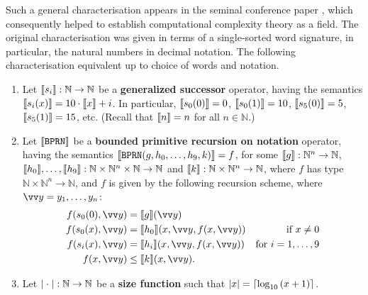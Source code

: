 Such a general characterisation appears in the seminal conference paper
\cite{cobham-1965}, which consequently helped to establish computational
complexity theory as a field\cite{clote-1999}. The original characterisation
was given in terms of a single-sorted word signature, in particular, the
natural numbers in decimal notation. The following characterisation equivalent
up to choice of words and notation. 

\def\smashf{\ensuremath{\mathtt{\#}}}
\def\cdotnot{\ensuremath{\cdot}}

\begin{definition} \cite{cobham-1965}

\begin{enumerate}[label=(\arabic*)]

\item Let $\sem{s_i} : \mathbb{N} \rightarrow \mathbb{N}$ be a
\textbf{generalized successor} operator, having the semantics $\sem{s_i\p{x}} =
10 \cdot \sem{x} + i$. In particular, $\sem{s_0\p{0}} = 0$, $\sem{s_0\p{1}} =
10$, $\sem{s_5\p{0}} = 5$, $\sem{s_5\p{1}} = 15$, etc. (Recall that $\sem{n} =
n$ for all $n \in \mathbb{N}$.)

\item Let $\sem{\mathtt{BPRN}}$ be a \textbf{bounded primitive recursion on
notation} operator, having the semantics
$\sem{\mathtt{BPRN}\p{g,h_0,\ldots,h_9,k}} = f$, for some $\sem{g} :
\mathbb{N}^n \rightarrow \mathbb{N}$, $\sem{h_0}, \ldots, \sem{h_9} :
\mathbb{N} \times \mathbb{N}^n \times \mathbb{N} \rightarrow \mathbb{N}$ and
$\sem{k} : \mathbb{N} \times \mathbb{N}^n \rightarrow \mathbb{N}$, where $f$
has type $\mathbb{N} \times \mathbb{N}^n \rightarrow \mathbb{N}$, and $f$ is
given by the following recursion scheme, where $\vect{y} =
y_1,\ldots,y_n$:\begin{align*}
%
f\p{s_0\p{0}, \vect{y}} &= \sem{g}\p{\vect{y}} \\
%
f\p{s_0\p{x}, \vect{y}} &= \sem{h_0}\p{x, \vect{y}, f\p{x, \vect{y}}} &
\text{if $x\neq 0$}\\
%
f\p{s_i\p{x}, \vect{y}} &= \sem{h_i}\p{x, \vect{y}, f\p{x, \vect{y}}} &
\text{for $i=1,\ldots,9$} \\
%
f\p{x, \vect{y}} &\leq \sem{k}\p{x, \vect{y}}.
%
\end{align*}

\item Let $\card{\mathrel{}\cdotnot\mathrel{}} : \mathbb{N} \rightarrow
\mathbb{N}$ be a \textbf{size function} such that $\card{x} =
\ceil{\log_{10}\p{x+1}}$.


\end{enumerate}
\end{definition}
